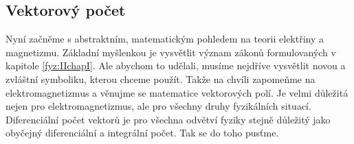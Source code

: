     \subsection{Vektorový počet}\label{fyz:IIchapIIsecII}
      Nyní začněme s abstraktním, matematickým pohledem na teorii elektřiny a magnetizmu. Základní
      myšlenkou je vysvětlit význam zákonů formulovaných v kapitole \ref{fyz:IIchapI}. Ale abychom
      to udělali, musíme nejdříve vysvětlit novou a zvláštní symboliku, kterou chceme použít. Takže
      na chvíli zapomeňme na elektromagnetizmus a věnujme se matematice vektorových polí. Je velmi
      důležitá nejen pro elektromagnetizmus, ale pro všechny druhy fyzikálních situací.
      Diferenciální počet vektorů je pro všechna odvětví fyziky stejně důležitý jako obyčejný
      diferenciální a integrální počet. Tak se do toho pusťme.
  
